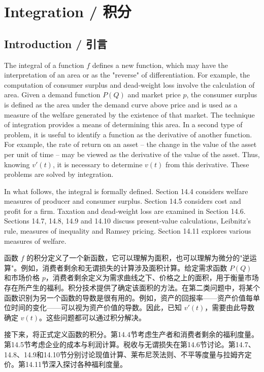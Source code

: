 \setcounter{chapter}{13}

\chapter{Integration / 积分}

\section{Introduction / 引言}

\begin{original}
The integral of a function $f$ defines a new function, which may have the interpretation of an area or as the "reverse" of differentiation. For example, the computation of consumer surplus and dead-weight loss involve the calculation of area. Given a demand function $P(Q)$ and market price $p$, the consumer surplus is defined as the area under the demand curve above price and is used as a measure of the welfare generated by the existence of that market. The technique of integration provides a means of determining this area. In a second type of problem, it is useful to identify a function as the derivative of another function. For example, the rate of return on an asset -- the change in the value of the asset per unit of time -- may be viewed as the derivative of the value of the asset. Thus, knowing $v'(t)$, it is necessary to determine $v(t)$ from this derivative. These problems are solved by integration.

In what follows, the integral is formally defined. Section 14.4 considers welfare measures of producer and consumer surplus. Section 14.5 considers cost and profit for a firm. Taxation and dead-weight loss are examined in Section 14.6. Sections 14.7, 14.8, 14.9 and 14.10 discuss present-value calculations, Leibnitz's rule, measures of inequality and Ramsey pricing. Section 14.11 explores various measures of welfare.
\end{original}
\begin{translation}
函数 $f$ 的积分定义了一个新函数，它可以理解为面积，也可以理解为微分的"逆运算"。例如，消费者剩余和无谓损失的计算涉及面积计算。给定需求函数 $P(Q)$ 和市场价格 $p$，消费者剩余定义为需求曲线之下、价格之上的面积，用于衡量市场存在所产生的福利。积分技术提供了确定该面积的方法。在第二类问题中，将某个函数识别为另一个函数的导数是很有用的。例如，资产的回报率——资产价值每单位时间的变化——可以视为资产价值的导数。因此，已知 $v'(t)$，需要由此导数确定 $v(t)$。这些问题都可以通过积分解决。

接下来，将正式定义函数的积分。第14.4节考虑生产者和消费者剩余的福利度量。第14.5节考虑企业的成本与利润计算。税收与无谓损失在第14.6节讨论。第14.7、14.8、14.9和14.10节分别讨论现值计算、莱布尼茨法则、不平等度量与拉姆齐定价。第14.11节深入探讨各种福利度量。
\end{translation}

